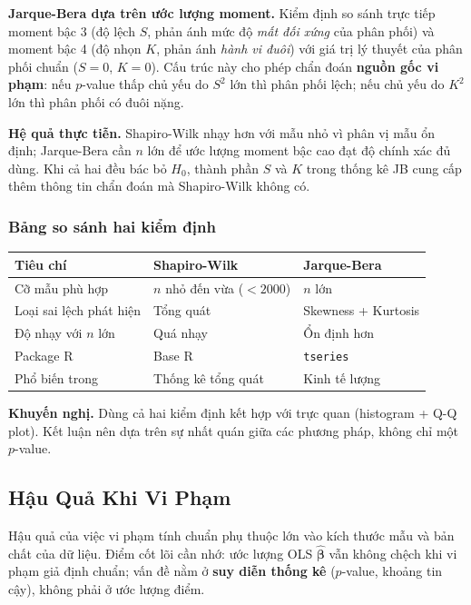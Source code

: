 \documentclass[12pt, a4paper]{article}
\begin{document}
\textbf{Jarque-Bera dựa trên ước lượng moment.} Kiểm định so sánh trực tiếp moment bậc 3 (độ lệch $S$, phản ánh mức độ \textit{mất đối xứng} của phân phối) và moment bậc 4 (độ nhọn $K$, phản ánh \textit{hành vi đuôi}) với giá trị lý thuyết của phân phối chuẩn ($S = 0$, $K = 0$). Cấu trúc này cho phép chẩn đoán \textbf{nguồn gốc vi phạm}: nếu $p$-value thấp chủ yếu do $S^2$ lớn thì phân phối lệch; nếu chủ yếu do $K^2$ lớn thì phân phối có đuôi nặng.

\textbf{Hệ quả thực tiễn.} Shapiro-Wilk nhạy hơn với mẫu nhỏ vì phân vị mẫu ổn định; Jarque-Bera cần $n$ lớn để ước lượng moment bậc cao đạt độ chính xác đủ dùng. Khi cả hai đều bác bỏ $H_0$, thành phần $S$ và $K$ trong thống kê JB cung cấp thêm thông tin chẩn đoán mà Shapiro-Wilk không có.

\subsubsection{Bảng so sánh hai kiểm định}

\begin{center}
\begin{tabular}{@{}lll@{}}
\toprule
\textbf{Tiêu chí} & \textbf{Shapiro-Wilk} & \textbf{Jarque-Bera} \\
\midrule
Cỡ mẫu phù hợp & $n$ nhỏ đến vừa ($< 2000$) & $n$ lớn \\
Loại sai lệch phát hiện & Tổng quát & Skewness + Kurtosis \\
Độ nhạy với $n$ lớn & Quá nhạy & Ổn định hơn \\
Package R & Base R & \texttt{tseries} \\
Phổ biến trong & Thống kê tổng quát & Kinh tế lượng \\
\bottomrule
\end{tabular}
\end{center}

\textbf{Khuyến nghị.} Dùng cả hai kiểm định kết hợp với trực quan (histogram + Q-Q plot). Kết luận nên dựa trên sự nhất quán giữa các phương pháp, không chỉ một $p$-value.

\subsection{Hậu Quả Khi Vi Phạm}

Hậu quả của việc vi phạm tính chuẩn phụ thuộc lớn vào kích thước mẫu và bản chất của dữ liệu. Điểm cốt lõi cần nhớ: ước lượng OLS $\hat{\boldsymbol{\beta}}$ vẫn không chệch khi vi phạm giả định chuẩn; vấn đề nằm ở \textbf{suy diễn thống kê} ($p$-value, khoảng tin cậy), không phải ở ước lượng điểm.
\end{document}
